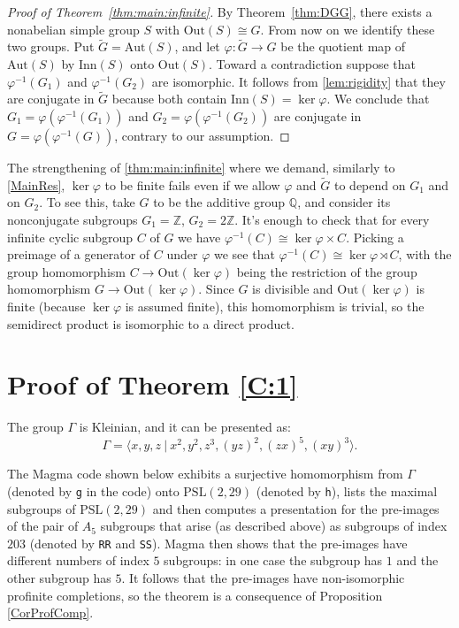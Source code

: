 \documentclass[11pt]{amsart}
\numberwithin{equation}{section}
\begin{document}
\begin{proof}[Proof of Theorem~\ref{thm:main:infinite}]
By Theorem~\ref{thm:DGG}, there exists a nonabelian simple group $S$ with $\mathrm{Out}(S) \cong G$. From now on we identify these two groups. Put $\widetilde G = \mathrm{Aut}(S)$, and let $\varphi \colon \widetilde G \to G$ be the quotient map of $\mathrm{Aut}(S)$ by $\mathrm{Inn}(S)$ onto $\mathrm{Out}(S)$. Toward a contradiction suppose that $\varphi^{-1}(G_1)$ and $\varphi^{-1}(G_2)$ are isomorphic. It follows from \cref{lem:rigidity} that they are conjugate in $\widetilde G$ because both contain $\mathrm{Inn}(S) = \ker \varphi$. We conclude that $G_1 = \varphi(\varphi^{-1}(G_1))$ and $G_2 = \varphi(\varphi^{-1}(G_2))$ are conjugate in $G = \varphi(\varphi^{-1}(G))$, contrary to our assumption.
\end{proof}

The strengthening of \cref{thm:main:infinite} where we demand, similarly to \cref{MainRes}, $\ker \varphi$ to be finite fails even if we allow $\varphi$ and $\widetilde G$ to depend on $G_1$ and on $G_2$. To see this, take $G$ to be the additive group $\mathbb Q$, and consider its nonconjugate subgroups $G_1=\mathbb{Z}$, $G_2=2\mathbb{Z}$. It's enough to check that for every infinite cyclic subgroup $C$ of $G$ we have $\varphi^{-1}(C) \cong \ker \varphi \times C$. Picking a preimage of a generator of $C$ under $\varphi$ we see that $\varphi^{-1}(C) \cong \ker \varphi \rtimes C$, with the group homomorphism $C \to \mathrm{Out}(\ker \varphi)$ being the restriction of the group homomorphism $G \to \mathrm{Out}(\ker \varphi)$. Since $G$ is divisible and $\mathrm{Out}(\ker \varphi)$ is finite (because $\ker \varphi$ is assumed finite), this homomorphism is trivial, so the semidirect product is isomorphic to a direct product. 

\section{Proof of Theorem \ref{C:1}}\label{Proof_C1}

The group $\Gamma$ is Kleinian, and it can be presented as:
$$\Gamma = \langle x,y,z~|~x^2, y^2, z^3, (yz)^2, (zx)^5, (xy)^3 \rangle.$$

\noindent  The Magma code shown below exhibits a surjective homomorphism from $\Gamma$ (denoted by {\tt{g}} in the code) onto $\mathrm{PSL}(2,29)$ (denoted by {\tt{h}}), lists the maximal subgroups of $\mathrm{PSL}(2,29)$ and then computes a presentation for the pre-images of the pair of $A_5$ subgroups that arise (as described above) as subgroups of index $203$ (denoted by {\tt{RR}} and {\tt{SS}}). Magma then shows that the pre-images have different numbers of index $5$ subgroups: in one case the subgroup has $1$ and the other subgroup has $5$. It follows that the pre-images have non-isomorphic profinite completions, so the theorem is a consequence of Proposition \ref{CorProfComp}.
\end{document}
